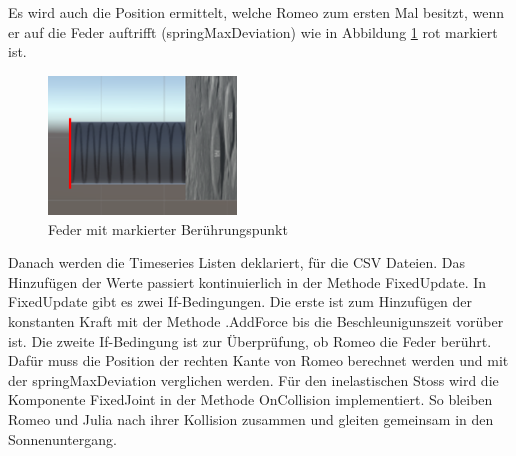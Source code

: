 \documentclass[../main.tex]{subfiles}
\begin{document}
    \begin{lstinputlisting}[label={lst:graphInelastic}, firstline=49, lastline=50]
    {\cubeControllerFiles}
    \end{lstinputlisting}
    Es wird auch die Position ermittelt, welche Romeo zum ersten Mal besitzt, wenn er auf die Feder auftrifft (springMaxDeviation) wie in Abbildung \ref{fig:2Lab_SpringDeviation} rot markiert ist.
    \begin{lstinputlisting}[label={lst:graphInelastic}, firstline=51, lastline=52]
    {\cubeControllerFiles}
    \end{lstinputlisting}


    \begin{figure}[H]
        \begin{center}
            \centerline{\includegraphics[width=50mm]{./images/2Lab_SpringDeviation.PNG}}
            \caption{Feder mit markierter Berührungspunkt}
            \label{fig:2Lab_SpringDeviation}
        \end{center}
    \end{figure}
    Danach werden die Timeseries Listen deklariert, für die CSV Dateien. Das Hinzufügen der Werte passiert kontinuierlich in der Methode FixedUpdate.
    \newline
    In FixedUpdate gibt es zwei If-Bedingungen. Die erste ist zum Hinzufügen der konstanten Kraft mit der Methode .AddForce bis die Beschleunigunszeit vorüber ist.
    Die zweite If-Bedingung ist zur Überprüfung, ob Romeo die Feder berührt. Dafür muss die Position der rechten Kante von Romeo berechnet werden und mit der
    springMaxDeviation verglichen werden.
    Für den inelastischen Stoss wird die Komponente FixedJoint in der Methode OnCollision implementiert. So bleiben Romeo und Julia  nach ihrer
    Kollision zusammen und gleiten gemeinsam in den Sonnenuntergang.
\end{document}
